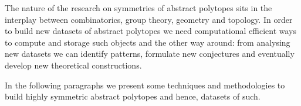 %
%


The nature of the research on symmetries of abstract polytopes sits in the interplay between combinatorics, group theory, geometry and topology.
In order to build new datasets of abstract polytopes we need computational efficient ways to compute and storage  such objects and the other way around: from analysing new datasets we can identify patterns, formulate new conjectures and eventually develop new theoretical constructions.

In the following paragraphs we present some techniques and methodologies to build highly symmetric abstract polytopes and hence, datasets of such.




